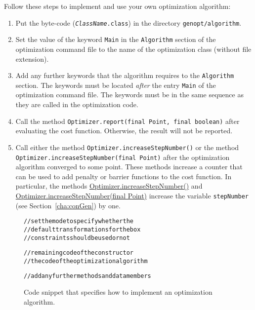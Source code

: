 Follow these steps to implement and use your own optimization algorithm:
\begin{enumerate}
\item 
Put the byte-code (\texttt{{\it ClassName}.class}) in the directory \texttt{genopt/algorithm}.
\item 
Set the value of the keyword \texttt{Main} in the \texttt{Algorithm} section of the optimization command file to the name of the optimization class (without file extension).
\item 
Add any further keywords that the algorithm requires 
to the \texttt{Algorithm} section. 
The keywords must be located \emph{after} the entry \texttt{Main} of the optimization command file. The keywords must be in the same sequence as they are called in the optimization code.
\item 
Call the method \texttt{Optimizer.report(final Point, final boolean)} 
after evaluating the cost function. 
Otherwise, the result will not be reported.
\item 
Call either the method \texttt{Optimizer.increaseStepNumber()}
or the method
\texttt{Optimizer.increaseStepNumber(final Point)}
after the optimization algorithm converged to some point.
These methods increase a counter that can be used to add penalty or 
barrier functions to the cost function.
In particular, the methods \url{Optimizer.increaseStepNumber()}
and \url{Optimizer.increaseStepNumber(final Point)} increase the
variable \texttt{stepNumber} (see Section~\ref{cha:conGen}) by one.
\end{enumerate}


\begin{figure}[ht!]
\centering
\begin{alltt}
      // set the mode to specify whether the
      // default transformations for the box
      // constraints should be used or not 

      // remaining code of the constructor
      // the code of the optimization algorithm \codeem{
   \}}

   // add any further methods and data members
\codeem{\}}
\end{alltt}
   \caption{Code snippet that specifies how to implement an optimization algorithm.}
   \label{fig:codAlgStrGen}
\end{figure}



